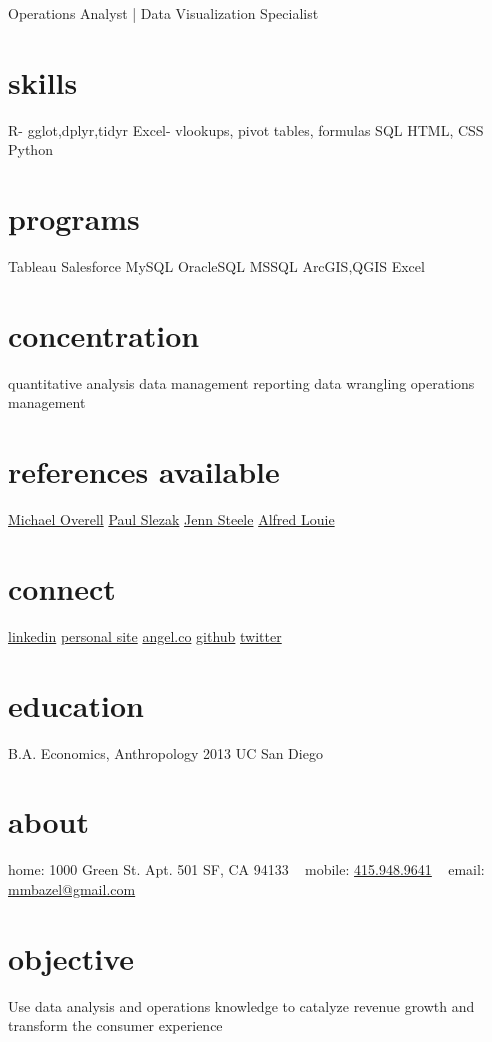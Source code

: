 \documentclass[]{friggeri-cv}
\begin{document}
       {Operations Analyst | Data Visualization Specialist}
\begin{aside}
\section{skills}
R-
gglot,dplyr,tidyr
Excel-
vlookups, pivot tables, formulas
SQL
HTML, CSS
Python
\section{programs}
Tableau
Salesforce
MySQL
OracleSQL
MSSQL
ArcGIS,QGIS
Excel
\section{concentration}
 quantitative analysis
 data management
 reporting
data wrangling
 operations management
  \section{references available}
\href{https://www.linkedin.com/in/michaeloverell}{Michael Overell}
\href{http://au.linkedin.com/in/paulslezak}{Paul Slezak}
\href{https://www.linkedin.com/in/jennsteele}{Jenn Steele}
\href{https://www.linkedin.com/pub/alfred-louie/a5/a46/281}{Alfred Louie} 
 \section{connect}
\href{https://www.linkedin.com/in/mikikobazeley}{linkedin}
\href{http://mikikobazeley.github.io}{personal site}
\href{https://angel.co/mikiko-bazeley}{angel.co}
\href{https://github.com/MMBazel}{github}
\href{https://twitter.com/MikikoBazeley}{twitter}
  \section{education}
B.A. Economics, Anthropology
2013
UC San Diego
  \section{about}
  home:
    1000 Green St.
    Apt. 501
    SF, CA 94133
    ~
    mobile: 
    \href{tel:14159489641}{415.948.9641}
    ~
    email:
    \href{mailto:mmbazel@gmail.com}{mmbazel@gmail.com}
\end{aside}

\section{objective}
Use data analysis and operations knowledge to catalyze revenue
growth and transform the consumer experience
\end{document}
